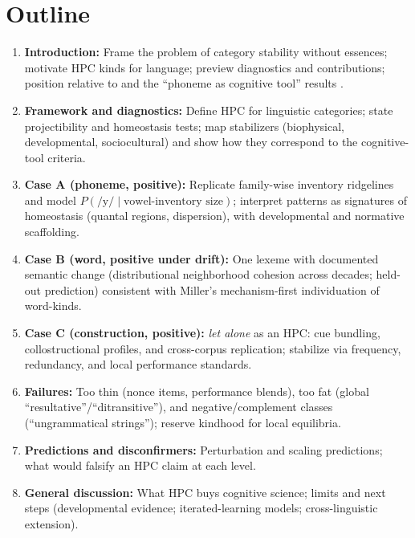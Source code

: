 \documentclass[12pt]{article}
\begin{document}
\section*{Outline}
\begin{enumerate}
  \item \textbf{Introduction:} Frame the problem of category stability without essences; motivate HPC kinds for language; preview diagnostics and contributions; position relative to \citet{Miller2021WordsSpeciesKinds} and the ``phoneme as cognitive tool'' results \citep{Ekstrom2025PhonemeTool}.
  \item \textbf{Framework and diagnostics:} Define HPC for linguistic categories; state projectibility and homeostasis tests; map stabilizers (biophysical, developmental, sociocultural) and show how they correspond to the cognitive-tool criteria.
  \item \textbf{Case A (phoneme, positive):} Replicate family-wise inventory ridgelines and model $P(\text{/y/}\mid \text{vowel-inventory size})$; interpret patterns as signatures of homeostasis (quantal regions, dispersion), with developmental and normative scaffolding.
  \item \textbf{Case B (word, positive under drift):} One lexeme with documented semantic change (distributional neighborhood cohesion across decades; held-out prediction) consistent with Miller's mechanism-first individuation of word-kinds.
  \item \textbf{Case C (construction, positive):} \emph{let alone} as an HPC: cue bundling, collostructional profiles, and cross-corpus replication; stabilize via frequency, redundancy, and local performance standards.
  \item \textbf{Failures:} Too thin (nonce items, performance blends), too fat (global ``resultative''/``ditransitive''), and negative/complement classes (``ungrammatical strings''); reserve kindhood for local equilibria.
  \item \textbf{Predictions and disconfirmers:} Perturbation and scaling predictions; what would falsify an HPC claim at each level.
  \item \textbf{General discussion:} What HPC buys cognitive science; limits and next steps (developmental evidence; iterated-learning models; cross-linguistic extension).
\end{enumerate}
\end{document}
